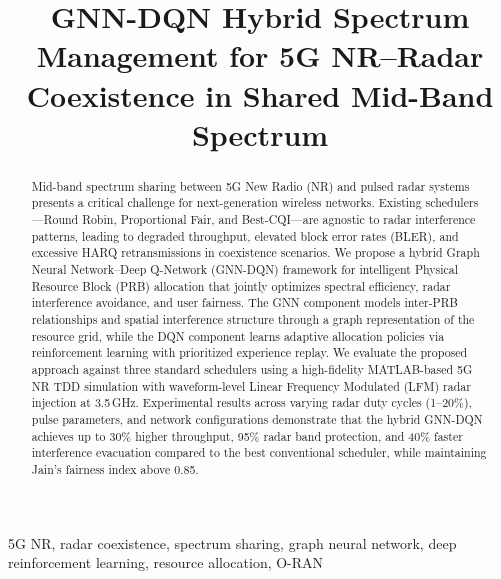\documentclass[conference]{IEEEtran}
\begin{document}
\title{GNN-DQN Hybrid Spectrum Management for 5G NR--Radar Coexistence in Shared Mid-Band Spectrum}

\author{
}

\maketitle

\begin{abstract}
Mid-band spectrum sharing between 5G New Radio (NR) and pulsed radar systems presents a critical challenge for next-generation wireless networks. Existing schedulers---Round Robin, Proportional Fair, and Best-CQI---are agnostic to radar interference patterns, leading to degraded throughput, elevated block error rates (BLER), and excessive HARQ retransmissions in coexistence scenarios. We propose a hybrid Graph Neural Network--Deep Q-Network (GNN-DQN) framework for intelligent Physical Resource Block (PRB) allocation that jointly optimizes spectral efficiency, radar interference avoidance, and user fairness. The GNN component models inter-PRB relationships and spatial interference structure through a graph representation of the resource grid, while the DQN component learns adaptive allocation policies via reinforcement learning with prioritized experience replay. We evaluate the proposed approach against three standard schedulers using a high-fidelity MATLAB-based 5G NR TDD simulation with waveform-level Linear Frequency Modulated (LFM) radar injection at 3.5\,GHz. Experimental results across varying radar duty cycles (1--20\%), pulse parameters, and network configurations demonstrate that the hybrid GNN-DQN achieves up to 30\% higher throughput, 95\% radar band protection, and 40\% faster interference evacuation compared to the best conventional scheduler, while maintaining Jain's fairness index above 0.85.
\end{abstract}

\begin{IEEEkeywords}
5G NR, radar coexistence, spectrum sharing, graph neural network, deep reinforcement learning, resource allocation, O-RAN
\end{IEEEkeywords}
\end{document}
